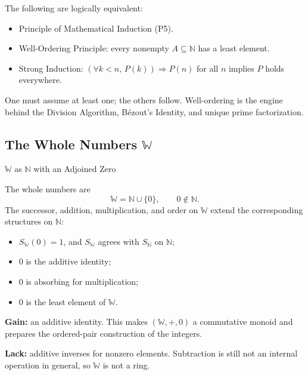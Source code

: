 \begin{remark*}
The following are logically equivalent:
\begin{itemize}
  \item Principle of Mathematical Induction (P5).
  \item Well-Ordering Principle: every nonempty $A \subseteq \mathbb{N}$
        has a least element.
  \item Strong Induction: $(\forall k < n,\, P(k)) \Rightarrow P(n)$
        for all $n$ implies $P$ holds everywhere.
\end{itemize}
One must assume at least one; the others follow.
Well-ordering is the engine behind the Division Algorithm, B\'{e}zout's Identity,
and unique prime factorization.
\end{remark*}

\subsection*{\texorpdfstring{The Whole Numbers $\mathbb{W}$}{The Whole Numbers W}}

\begin{topicbox}{$\mathbb{W}$ as $\mathbb{N}$ with an Adjoined Zero}
\begin{exposition}
The whole numbers are
\[
\mathbb{W}=\mathbb{N}\cup\{0\},
\qquad 0\notin\mathbb{N}.
\]
The successor, addition, multiplication, and order on $\mathbb{W}$ extend the
corresponding structures on $\mathbb{N}$:
\begin{itemize}
  \item $S_{\mathbb{W}}(0)=1$, and $S_{\mathbb{W}}$ agrees with
        $S_{\mathbb{N}}$ on $\mathbb{N}$;
  \item $0$ is the additive identity;
  \item $0$ is absorbing for multiplication;
  \item $0$ is the least element of $\mathbb{W}$.
\end{itemize}
\end{exposition}
\end{topicbox}

\begin{remark*}
\textbf{Gain:} an additive identity. This makes
$(\mathbb{W},+,0)$ a commutative monoid and prepares the ordered-pair
construction of the integers.

\textbf{Lack:} additive inverses for nonzero elements. Subtraction is still
not an internal operation in general, so $\mathbb{W}$ is not a ring.
\end{remark*}

